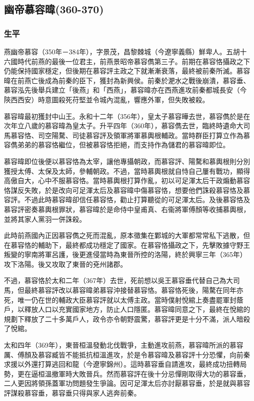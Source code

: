 
\subsection{幽帝慕容暐\tiny(360-370)}

\subsubsection{生平}

燕幽帝慕容（350年－384年），字景茂，昌黎棘城（今遼寧義縣）鮮卑人。五胡十六國時代前燕的最後一位君主，前燕景昭帝慕容儁第三子。前期在慕容恪攝政之下仍能保持國家穩定，但後期在慕容評主政之下就漸漸衰落，最終被前秦所滅。慕容暐在前燕亡後成為前秦的臣下，獲封為新興侯。前秦於淝水之戰後崩潰，慕容垂、慕容泓先後舉兵建立「後燕」和「西燕」，慕容暐亦在西燕進攻前秦都城長安（今陝西西安）時意圖殺死苻堅並令城內混亂，響應外軍，但失敗被殺。

慕容暐最初獲封中山王。永和十二年（356年），皇太子慕容曄去世，慕容儁於是在次年立八歲的慕容暐為皇太子。升平四年（360年），慕容儁去世，臨終時遺命大司馬慕容恪、司空陽騖、司徒慕容評及領軍將軍慕輿根輔政。當時群臣打算立作為慕容儁弟弟的慕容恪繼位，但被慕容恪拒絕，而支持作為儲君的慕容暐即位。

慕容暐即位後便以慕容恪為太宰，讓他專攝朝政，而慕容評、陽騖和慕輿根則分別獲授太傅、太保及太師，參輔朝政。不過，當時慕輿根就自恃自己屢有戰功，顯得高傲自大，心中不服慕容恪。當時慕輿根打算作亂，初以可足渾太后干政煽動慕容恪謀反失敗，於是改向可足渾太后及慕容暐中傷慕容恪，想要他們誅殺慕容恪及慕容評。不過此時慕容暐卻信任慕容恪，勸止打算聽從的可足渾太后。及後慕容恪及慕容評密奏慕輿根罪狀，慕容暐於是命侍中皇甫真、右衞將軍傅顏等收捕慕輿根，並將其家人黨羽一併誅殺。

此時前燕國內正因慕容儁之死而混亂，原本徵集在鄴城的大軍都常常私下逃散，但在慕容恪的輔助下，最終都成功穩定了國家。在慕容恪攝政之下，先擊敗據守野王叛變的寧南將軍呂護，後更進侵當時為東晉所控的洛陽，終於興寧三年（365年）攻下洛陽。後又攻取了東晉的兗州諸郡。

不過，慕容恪於太和二年（367年）去世，死前想以吳王慕容垂代替自己為大司馬，但最終慕容評改以慕容暐弟慕容沖接替慕容恪。慕容恪死後，陽騖在同年亦死，唯一仍在世的輔政大臣慕容評就以太傅主政。當時僕射悅綰上奏盡罷軍封蔭戶，以釋放人口以充實國家地方，防止人口隱匿。慕容暐同意之下，最終在悅綰的規劃下釋放了二十多萬戶人，政令亦令朝野震驚，慕容評更是十分不滿，派人暗殺了悅綰。

太和四年（369年），東晉桓溫發動北伐戰爭，主動進攻前燕，慕容暐所派的慕容厲、傅顏及慕容臧皆不能抵抗桓溫進攻，於是令慕容暐及慕容評十分恐懼，向前秦求援以外還打算逃回和龍（今遼寧錦州）。這時慕容垂自請進攻，最終成功扭轉局勢，更在逼桓溫撤軍時大敗晉兵。然而慕容評在後十分忌憚剛取得大功的慕容垂，二人更因將領孫蓋軍功問題發生爭論。因可足渾太后亦討厭慕容垂，於是就與慕容評謀殺慕容垂，慕容垂只得與家人逃奔前秦。

